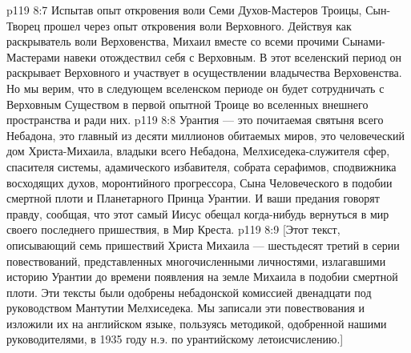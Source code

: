 \vs p119 8:7 Испытав опыт откровения воли Семи Духов\hyp{}Мастеров Троицы, Сын\hyp{}Творец прошел через опыт откровения воли Верховного. Действуя как раскрыватель воли Верховенства, Михаил вместе со всеми прочими Сынами\hyp{}Мастерами навеки отождествил себя с Верховным. В этот вселенский период он раскрывает Верховного и участвует в осуществлении владычества Верховенства. Но мы верим, что в следующем вселенском периоде он будет сотрудничать с Верховным Существом в первой опытной Троице во вселенных внешнего пространства и ради них.
\vs p119 8:8 \pc Урантия --- это почитаемая святыня всего Небадона, это главный из десяти миллионов обитаемых миров, это человеческий дом Христа\hyp{}Михаила, владыки всего Небадона, Мелхиседека\hyp{}служителя сфер, спасителя системы, адамического избавителя, собрата серафимов, сподвижника восходящих духов, моронтийного прогрессора, Сына Человеческого в подобии смертной плоти и Планетарного Принца Урантии. И ваши предания говорят правду, сообщая, что этот самый Иисус обещал когда\hyp{}нибудь вернуться в мир своего последнего пришествия, в Мир Креста.
\separatorline
\vsetoff
\vs p119 8:9 [Этот текст, описывающий семь пришествий Христа Михаила --- шестьдесят третий в серии повествований, представленных многочисленными личностями, излагавшими историю Урантии до времени появления на земле Михаила в подобии смертной плоти. Эти тексты были одобрены небадонской комиссией двенадцати под руководством Мантутии Мелхиседека. Мы записали эти повествования и изложили их на английском языке, пользуясь методикой, одобренной нашими руководителями, в 1935 году н.э. по урантийскому летоисчислению.]

